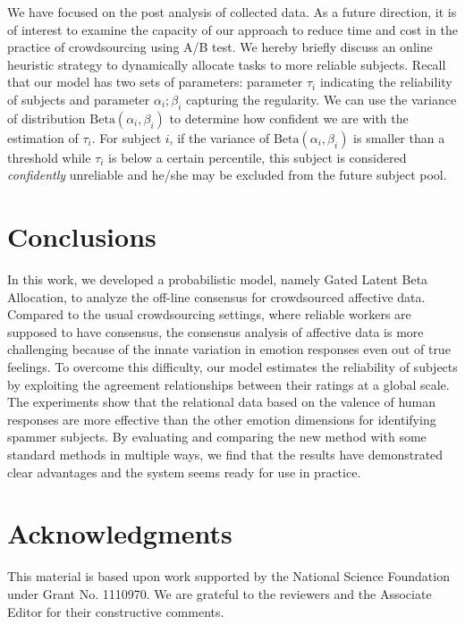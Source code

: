 \documentclass[10pt,journal,letterpaper,compsoc,twoside]{IEEEtran}
\begin{document}
{We have focused on the post analysis of collected data. 
As a future direction, it is of interest to examine the capacity of our approach to reduce time and cost in the practice of crowdsourcing using A/B test. 
We hereby briefly discuss an online heuristic strategy to dynamically allocate tasks to more reliable subjects. 
Recall that our model has two sets of parameters:
parameter $\tau_i$ indicating the reliability of subjects and parameter $\alpha_i; \beta_i$ capturing the regularity. 
We can use the variance of distribution $\textrm{Beta}(\alpha_i, \beta_i)$ to determine how confident we are with the estimation 
of $\tau_i$. For subject $i$, if the variance of $\textrm{Beta}(\alpha_i, \beta_i)$ 
is smaller than a threshold while $\tau_i$ is below a certain percentile, 
this subject is considered {\em confidently} unreliable and he/she may be excluded from the future subject pool.}

\section{Conclusions}
In this work, we developed a probabilistic model, namely Gated Latent Beta Allocation, to analyze
the off-line consensus for crowdsourced affective data. 
Compared to the usual crowdsourcing settings, where reliable 
workers are supposed to have consensus, the consensus
analysis of affective data is more challenging because of the innate variation in emotion responses even out of true feelings.  To overcome this difficulty,  our
model estimates the reliability of subjects by exploiting the agreement relationships between their ratings at a global scale. The experiments show that the relational data based on the valence of human responses are more effective than the other emotion dimensions for identifying spammer subjects. 
By evaluating and comparing the new method with some standard methods in multiple ways, we find that the results have demonstrated clear advantages and the system seems ready for use in practice.

\section*{Acknowledgments}
This material is based upon work supported by the National Science Foundation under Grant No. 1110970. We are grateful to the reviewers and the Associate Editor for their constructive comments.


%

\end{document}
